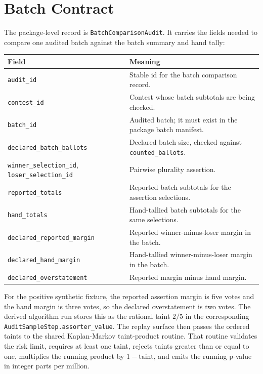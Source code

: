 \section{Batch Contract}

The package-level record is \texttt{BatchComparisonAudit}. It carries the fields
needed to compare one audited batch against the batch summary and hand tally:

\begin{center}
\small
\begin{tabularx}{\textwidth}{lX}
\toprule
Field & Meaning \\
\midrule
\texttt{audit\_id} & Stable id for the batch comparison record. \\
\texttt{contest\_id} & Contest whose batch subtotals are being checked. \\
\texttt{batch\_id} & Audited batch; it must exist in the package batch manifest. \\
\texttt{declared\_batch\_ballots} & Declared batch size, checked against \texttt{counted\_ballots}. \\
\texttt{winner\_selection\_id}, \texttt{loser\_selection\_id} & Pairwise plurality assertion. \\
\texttt{reported\_totals} & Reported batch subtotals for the assertion selections. \\
\texttt{hand\_totals} & Hand-tallied batch subtotals for the same selections. \\
\texttt{declared\_reported\_margin} & Reported winner-minus-loser margin in the batch. \\
\texttt{declared\_hand\_margin} & Hand-tallied winner-minus-loser margin in the batch. \\
\texttt{declared\_overstatement} & Reported margin minus hand margin. \\
\bottomrule
\end{tabularx}
\end{center}

For the positive synthetic fixture, the reported assertion margin is five votes
and the hand margin is three votes, so the declared overstatement is two votes.
The derived algorithm run stores this as the rational taint $2/5$ in the
corresponding \texttt{AuditSampleStep.assorter\_value}. The replay surface then
passes the ordered taints to the shared Kaplan-Markov taint-product routine.
That routine validates the risk limit, requires at least one taint, rejects
taints greater than or equal to one, multiplies the running product by
$1-\text{taint}$, and emits the running p-value in integer parts per million.
